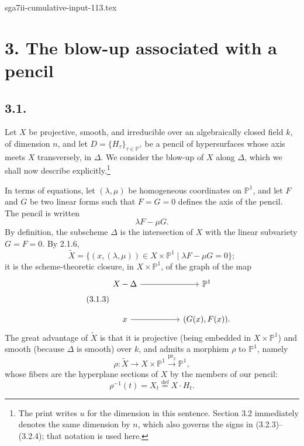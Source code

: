 \begin{filecontents*}{sga7ii-cumulative-input-113.tex}
\section*{3. The blow-up associated with a pencil}

\subsection*{3.1.}
Let $X$ be projective, smooth, and irreducible over an algebraically closed
field $k$, of dimension $n$, and let
$D=\{H_\tau\}_{\tau\in\mathbb P^1}$ be a pencil of hypersurfaces whose axis
meets $X$ transversely, in $\Delta$.
We consider the blow-up of $X$ along $\Delta$, which we shall now describe
explicitly.\footnote{The print writes $u$ for the dimension in this sentence.
Section 3.2 immediately denotes the same dimension by $n$, which also
governs the signs in (3.2.3)--(3.2.4); that notation is used here.}

In terms of equations, let $(\lambda,\mu)$ be homogeneous coordinates on
$\mathbb P^1$, and let $F$ and $G$ be two linear forms such that $F=G=0$
defines the axis of the pencil.  The pencil is written
\begin{equation}\tag{3.1.1}
\lambda F-\mu G.
\end{equation}
By definition, the subscheme $\Delta$ is the intersection of $X$ with the
linear subvariety $G=F=0$.  By 2.1.6,
\begin{equation}\tag{3.1.2}
\widetilde X
=\{(x,(\lambda,\mu))\in X\times\mathbb P^1
       \mid \lambda F-\mu G=0\};
\end{equation}
it is the scheme-theoretic closure, in $X\times\mathbb P^1$, of the graph of
the map
\begin{equation}\tag{3.1.3}
\begin{tikzcd}[row sep=large,column sep=huge]
X-\Delta \arrow[r] & \mathbb P^1 \\
x \arrow[r] & (G(x),F(x)).
\end{tikzcd}
\end{equation}
The great advantage of $\widetilde X$ is that it is projective (being
embedded in $X\times\mathbb P^1$) and smooth (because $\Delta$ is smooth)
over $k$, and admits a morphism $\rho$ to $\mathbb P^1$, namely
\begin{equation}\tag{3.1.4}
\rho:\widetilde X\longrightarrow X\times\mathbb P^1
\xrightarrow{\operatorname{pr}_2}\mathbb P^1,
\end{equation}
whose fibers are the hyperplane sections of $X$ by the members of our
pencil:
\[
\rho^{-1}(t)=X_t\overset{\mathrm{def}}{=}X\cdot H_t.
\]


\end{filecontents*}
